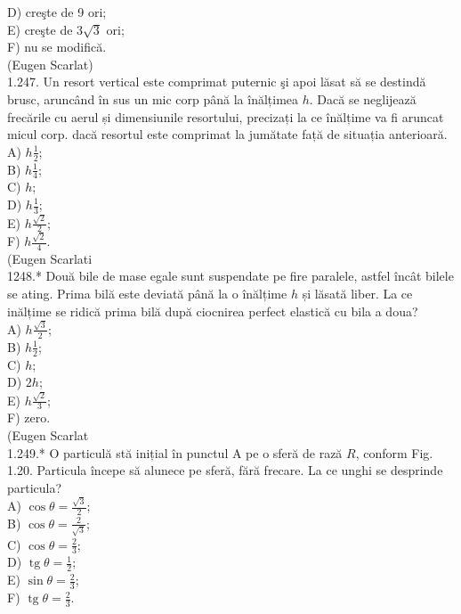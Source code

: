 {D) creşte de 9 ori;\\
E) creşte de $3 \sqrt{3}$ ori;\\
F) nu se modifică.\\
(Eugen Scarlat)\\
1.247. Un resort vertical este comprimat puternic şi apoi lăsat să se destindă brusc, aruncând în sus un mic corp până la înălțimea $h$. Dacă se neglijează frecările cu aerul și dimensiunile resortului, precizați la ce înălțime va fi aruncat micul corp. dacă resortul este comprimat la jumătate față de situația anterioară.\\
A) $h \frac{1}{2}$;\\
B) $h \frac{1}{4}$;\\
C) $h$;\\
D) $h \frac{1}{3}$;\\
E) $h \frac{\sqrt{2}}{2}$;\\
F) $h \frac{\sqrt{2}}{4}$.\\
(Eugen Scarlati\\
1248.* Două bile de mase egale sunt suspendate pe fire paralele, astfel încât bilele se ating. Prima bilă este deviată până la o înălțime $h$ și lăsată liber. La ce inălțime se ridică prima bilă după ciocnirea perfect elastică cu bila a doua?\\
A) $h \frac{\sqrt{3}}{2}$;\\
B) $h \frac{1}{2}$;\\
C) $h$;\\
D) $2 h$;\\
E) $h \frac{\sqrt{2}}{3}$;\\
F) zero.\\
(Eugen Scarlat\\
1.249.* O particulă stă inițial în punctul A pe o sferă de rază $R$, conform Fig. 1.20. Particula începe să alunece pe sferă, fără frecare. La ce unghi se desprinde particula?\\
A) $\cos \theta=\frac{\sqrt{3}}{2}$;\\
B) $\cos \theta=\frac{2}{\sqrt{3}}$;\\
C) $\cos \theta=\frac{2}{3}$;\\
D) $\operatorname{tg} \theta=\frac{1}{2}$;\\
E) $\sin \theta=\frac{2}{3}$;\\
F) $\operatorname{tg} \theta=\frac{2}{3}$.

}
